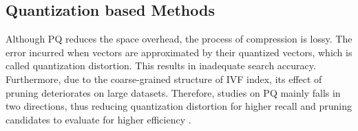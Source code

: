 \documentclass[11pt]{article}
\begin{document}
\subsection{Quantization based Methods}

Although PQ reduces the space overhead, the process of compression is lossy. The error incurred when vectors are approximated by their quantized vectors, which is called quantization distortion. This results in inadequate search accuracy. Furthermore, due to the coarse-grained structure of IVF index, its effect of pruning deteriorates on large datasets. Therefore, studies on PQ mainly falls in two directions, thus reducing quantization distortion for higher recall \cite{DBLP:conf/cvpr/GeHK013,DBLP:conf/cvpr/KalantidisA14,8404126,Noh_2021_ICCV} and pruning candidates to evaluate for higher efficiency \cite{DBLP:journals/pami/BabenkoL15,DBLP:conf/cvpr/YandexL16,DBLP:conf/sigmod/LiZAH20,DBLP:conf/icde/ZhengYHYLX0J23}.
\end{document}
